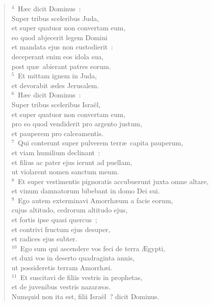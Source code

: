 \begin{flushleft}\begin{verse}${}^{4}$~H\ae c dicit Dominus~:\\ Super tribus sceleribus Juda,\\ et super quatuor non convertam eum,\\ eo quod abjecerit legem Domini\\ et mandata ejus non custodierit~:\\ deceperant enim eos idola sua,\\ post qu\ae\ abierant patres eorum.\\
${}^{5}$~Et mittam ignem in Juda,\\ et devorabit \ae des Jerusalem.\\
${}^{6}$~H\ae c dicit Dominus~:\\ Super tribus sceleribus Isra\"el,\\ et super quatuor non convertam eum,\\ pro eo quod vendiderit pro argento justum,\\ et pauperem pro calceamentis.\\
${}^{7}$~Qui conterunt super pulverem terr\ae\ capita pauperum,\\ et viam humilium declinant~:\\ et filius ac pater ejus ierunt ad puellam,\\ ut violarent nomen sanctum meum.\\
${}^{8}$~Et super vestimentis pignoratis accubuerunt juxta omne altare,\\ et vinum damnatorum bibebant in domo Dei sui.\\
${}^{9}$~Ego autem exterminavi Amorrh\ae um a facie eorum,\\ cujus altitudo, cedrorum altitudo ejus,\\ et fortis ipse quasi quercus~;\\ et contrivi fructum ejus desuper,\\ et radices ejus subter.\\
${}^{10}$~Ego sum qui ascendere vos feci de terra \AE gypti,\\ et duxi vos in deserto quadraginta annis,\\ ut possideretis terram Amorrh\ae i.\\
${}^{11}$~Et suscitavi de filiis vestris in prophetas,\\ et de juvenibus vestris nazar\ae os.\\ Numquid non ita est, filii Isra\"el~? dicit Dominus.\\

\end{verse}
\end{flushleft}
